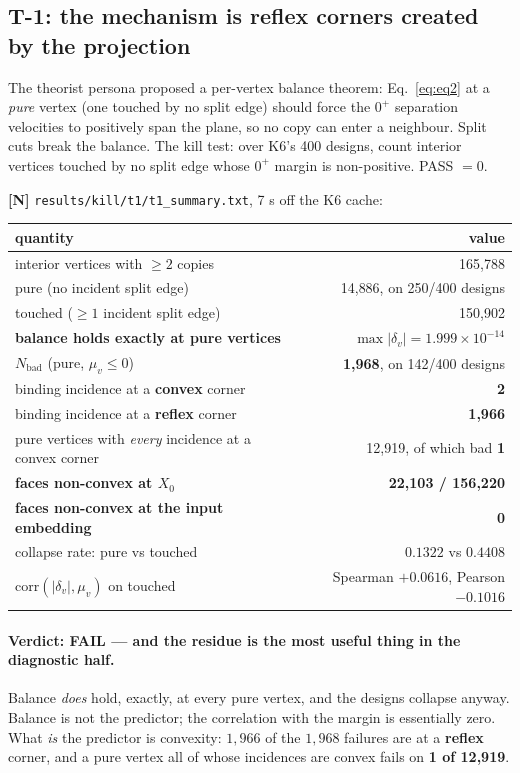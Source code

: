 \documentclass[11pt,a4paper]{article}
\theoremstyle{definition}
\newcommand{\file}[1]{\texttt{\small #1}}
\begin{document}
\subsection{T-1: the mechanism is reflex corners created by the projection}
\label{sec:t1exp}

The theorist persona proposed a per-vertex balance theorem: Eq.~\eqref{eq:eq2} at a
\emph{pure} vertex (one touched by no split edge) should force the $0^+$ separation velocities
to positively span the plane, so no copy can enter a neighbour. Split cuts break the balance.
The kill test: over K6's 400 designs, count interior vertices touched by no split edge whose
$0^+$ margin is non-positive. PASS $=0$.

\textbf{[N]} \file{results/kill/t1/t1\_summary.txt}, 7 s off the K6 cache:

\begin{center}
\small
\begin{tabular}{@{}lr@{}}
\toprule
quantity & value \\
\midrule
interior vertices with $\ge2$ copies & 165{,}788 \\
\quad pure (no incident split edge) & 14{,}886, on 250/400 designs \\
\quad touched ($\ge1$ incident split edge) & 150{,}902 \\
\textbf{balance holds exactly at pure vertices} & $\max|\delta_v| = 1.999\times10^{-14}$ \\
$N_{\mathrm{bad}}$ (pure, $\mu_v\le0$) & \textbf{1{,}968}, on 142/400 designs \\
\quad binding incidence at a \textbf{convex} corner & \textbf{2} \\
\quad binding incidence at a \textbf{reflex} corner & \textbf{1{,}966} \\
pure vertices with \emph{every} incidence at a convex corner & 12{,}919, of which bad \textbf{1} \\
\textbf{faces non-convex at $X_0$} & \textbf{22{,}103 / 156{,}220} \\
\textbf{faces non-convex at the input embedding} & \textbf{0} \\
collapse rate: pure vs touched & $0.1322$ vs $0.4408$ \\
$\mathrm{corr}(|\delta_v|,\mu_v)$ on touched & Spearman $+0.0616$, Pearson $-0.1016$ \\
\bottomrule
\end{tabular}
\end{center}

\paragraph{Verdict: FAIL --- and the residue is the most useful thing in the diagnostic half.}
Balance \emph{does} hold, exactly, at every pure vertex, and the designs collapse anyway.
Balance is not the predictor; the correlation with the margin is essentially zero. What
\emph{is} the predictor is convexity: $1{,}966$ of the $1{,}968$ failures are at a
\textbf{reflex} corner, and a pure vertex all of whose incidences are convex fails on
\textbf{1 of 12{,}919}.
\end{document}
